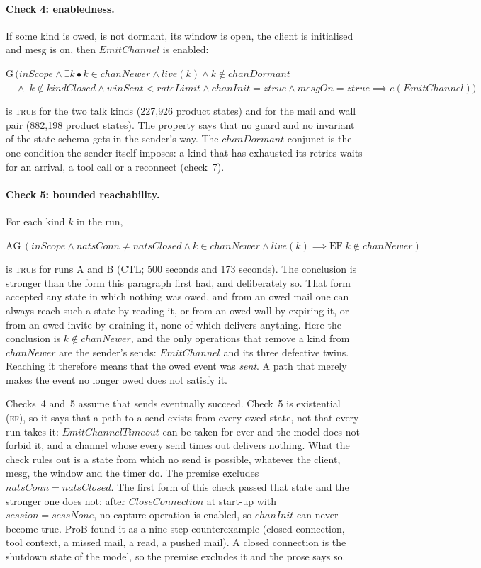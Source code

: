 \documentclass[a4paper,10pt,fleqn]{article}
\begin{document}
\paragraph{Check 4: enabledness.}  If some kind is owed, is not dormant, its
window is open, the client is initialised and mesg is on, then $EmitChannel$
is enabled:
\begin{center}
$\mathrm{G}\,(\mathit{inScope} \land \exists k \bullet k \in chanNewer
\land \mathit{live}(k) \land k \notin chanDormant$ \\
$\quad \land\; k \notin kindClosed \land winSent < rateLimit
\land chanInit = ztrue \land mesgOn = ztrue
\implies e(EmitChannel))$
\end{center}
is \textsc{true} for the two talk kinds (227{,}926 product states) and for the
mail and wall pair (882{,}198 product states).  The property says that no guard and no
invariant of the state schema gets in the sender's way.  The $chanDormant$
conjunct is the one condition the sender itself imposes: a kind that has
exhausted its retries waits for an arrival, a tool call or a reconnect
(check~7).

\paragraph{Check 5: bounded reachability.}  For each kind $k$ in the run,
\begin{center}
$\mathrm{AG}\,(\mathit{inScope} \land natsConn \neq natsClosed \land
k \in chanNewer \land \mathit{live}(k)
\implies \mathrm{EF}\; k \notin chanNewer)$
\end{center}
is \textsc{true} for runs A and B (CTL; 500 seconds and 173 seconds).  The
conclusion is stronger than the form this paragraph first had, and
deliberately so.  That form accepted any state in which nothing was owed,
and from an owed mail one can always reach such a state by reading it, or
from an owed wall by expiring it, or from an owed invite by draining it, none
of which delivers anything.  Here the conclusion is $k \notin chanNewer$, and
the only operations that remove a kind from $chanNewer$ are the sender's
sends: $EmitChannel$ and its three defective twins.  Reaching it therefore
means that the owed event was \emph{sent}.  A path that merely makes the
event no longer owed does not satisfy it.

Checks~4 and~5 assume that sends eventually succeed.  Check~5 is existential
(\textsc{ef}), so it says that a path to a send exists from every owed
state, not that every run takes it: $EmitChannelTimeout$ can be taken for
ever and the model does not forbid it, and a channel whose every send times
out delivers nothing.  What the check rules out is a state from which no
send is possible, whatever the client, mesg, the window and the timer do.
The premise excludes $natsConn = natsClosed$.  The first form of this check
passed that state and the stronger one does not: after $CloseConnection$ at
start-up with $session = sessNone$, no capture operation is enabled, so
$chanInit$ can never become true.  ProB found it as a nine-step
counterexample (closed connection, tool context, a missed mail, a read, a
pushed mail).  A closed connection is the shutdown state of the model, so the
premise excludes it and the prose says so.
\end{document}
